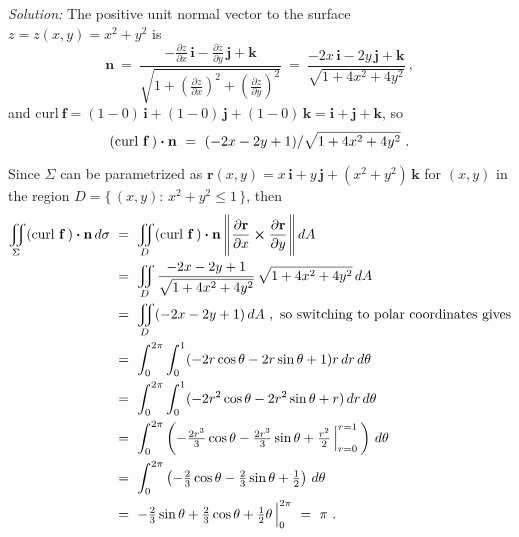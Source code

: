 \begin{exmp}
{
 }
 \par\noindent\emph{Solution:} The positive unit normal vector to the surface\\$z=z(x,y)=x^2 + y^2$ is
 \begin{displaymath}
  \mathbf{n} ~=~
   \frac{-\frac{\partial z}{\partial x}\,\mathbf{i} - \frac{\partial z}{\partial y}\,\mathbf{j} +
   \mathbf{k}}{\sqrt{1 + \left( \tfrac{\partial z}{\partial x} \right)^2 +
   \left( \tfrac{\partial z}{\partial y} \right)^2}} ~=~
   \frac{-2x\,\mathbf{i} - 2y\,\mathbf{j} + \mathbf{k}}{\sqrt{1 + 4x^2 + 4y^2}} ~,
 \end{displaymath}
 and $\text{curl}~\mathbf{f}= (1-0)\,\mathbf{i}+(1-0)\,\mathbf{j}+(1-0)\,\mathbf{k} = \mathbf{i}+\mathbf{j}+\mathbf{k}$,
 so
 \begin{displaymath}
  (\text{curl}~{\mathbf{f}}\,) \bm{\cdot} \mathbf{n} ~=~ (-2x-2y+1)/\sqrt{1 + 4x^2 + 4y^2} ~.
 \end{displaymath}
 
 \par\noindent
 Since $\Sigma$ can be parametrized as $\mathbf{r}(x,y) = x\,\mathbf{i}+y\,\mathbf{j}+(x^2 + y^2 )\,\mathbf{k}$ for
 $(x,y)$ in the region $D = \lbrace \, (x,y):\,x^2 + y^2 \le 1 \,\rbrace$, then
 \begin{align*}
  \iint\limits_{\Sigma} (\text{curl}~{\mathbf{f}}\,) \bm{\cdot} \mathbf{n}\,d\sigma ~&=~
   \iint\limits_{D} (\text{curl}~{\mathbf{f}}\,) \bm{\cdot} \mathbf{n}\,
   \Biggl\lVert\mspace{1mu}\frac{\partial \mathbf{r}}{\partial x} \bm{\times} \frac{\partial \mathbf{r}}{\partial y}\mspace{1mu}\Biggr\rVert\,dA\\
   &=~ \iint\limits_{D} \frac{-2x-2y+1}{\sqrt{1 + 4x^2 + 4y^2}}\,\sqrt{1 + 4x^2 + 4y^2}\,dA\\
   &=~ \iint\limits_{D} (-2x-2y+1)\,dA ~,~\text{so switching to polar coordinates gives}\\
   &=~ \int_0^{2\pi} \int_0^1 (-2r\cos \theta - 2r\sin \theta + 1)r\,dr\,d\theta\\
   &=~ \int_0^{2\pi} \int_0^1 (-2r^2 \cos \theta - 2r^2 \sin \theta + r)\,dr\,d\theta\\
   &=~ \int_0^{2\pi} \left( -\tfrac{2r^3}{3} \cos \theta - \tfrac{2r^3}{3} \sin \theta +
   \tfrac{r^2}{2}\,\Big|_{r=0}^{r=1} \,\right)\,d\theta\\
   &=~ \int_0^{2\pi} \left( -\tfrac{2}{3} \cos \theta - \tfrac{2}{3} \sin \theta + \tfrac{1}{2} \right)\,d\theta\\
   &=~ -\tfrac{2}{3} \sin \theta + \tfrac{2}{3} \cos \theta + \tfrac{1}{2}\theta\,\Big|_0^{2\pi} ~=~ \pi ~.
 \end{align*}
 

\end{exmp}
